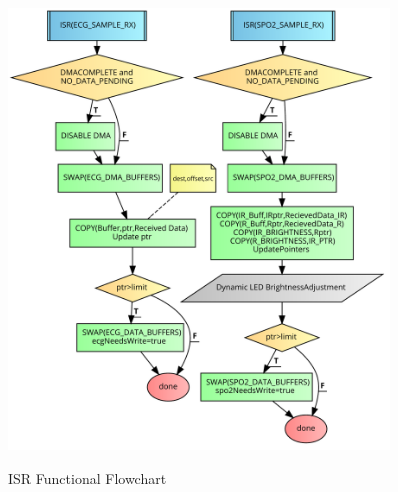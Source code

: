\begin{figure}
	\begin{center}
		\label{fig:flowchart_ISR}
		\includegraphics[scale=1,width=0.9\textwidth]{Images/FlowChartISR.pdf} 
		\caption{ISR Functional Flowchart}
	\end{center}
\end{figure}


